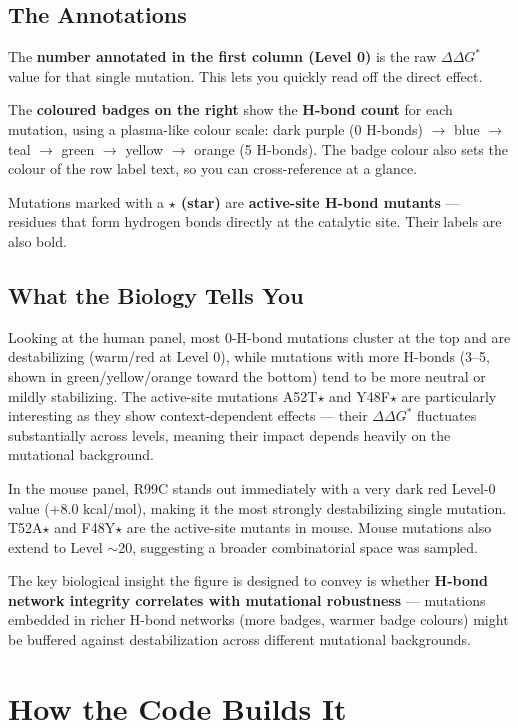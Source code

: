 \documentclass[12pt]{article}
\begin{document}
\subsection*{The Annotations}

The \textbf{number annotated in the first column (Level 0)} is the raw $\Delta\Delta G^{*}$ value for that single mutation. This lets you quickly read off the direct effect.

The \textbf{coloured badges on the right} show the \textbf{H-bond count} for each mutation, using a plasma-like colour scale: dark purple (0 H-bonds) $\rightarrow$ blue $\rightarrow$ teal $\rightarrow$ green $\rightarrow$ yellow $\rightarrow$ orange (5 H-bonds). The badge colour also sets the colour of the row label text, so you can cross-reference at a glance.

Mutations marked with a \textbf{$\star$ (star)} are \textbf{active-site H-bond mutants} --- residues that form hydrogen bonds directly at the catalytic site. Their labels are also bold.

\subsection*{What the Biology Tells You}

Looking at the human panel, most 0-H-bond mutations cluster at the top and are destabilizing (warm/red at Level 0), while mutations with more H-bonds (3--5, shown in green/yellow/orange toward the bottom) tend to be more neutral or mildly stabilizing. The active-site mutations A52T$\star$ and Y48F$\star$ are particularly interesting as they show context-dependent effects --- their $\Delta\Delta G^{*}$ fluctuates substantially across levels, meaning their impact depends heavily on the mutational background.

In the mouse panel, R99C stands out immediately with a very dark red Level-0 value (+8.0 kcal/mol), making it the most strongly destabilizing single mutation. T52A$\star$ and F48Y$\star$ are the active-site mutants in mouse. Mouse mutations also extend to Level $\sim$20, suggesting a broader combinatorial space was sampled.

The key biological insight the figure is designed to convey is whether \textbf{H-bond network integrity correlates with mutational robustness} --- mutations embedded in richer H-bond networks (more badges, warmer badge colours) might be buffered against destabilization across different mutational backgrounds.

\section*{How the Code Builds It}
\end{document}
